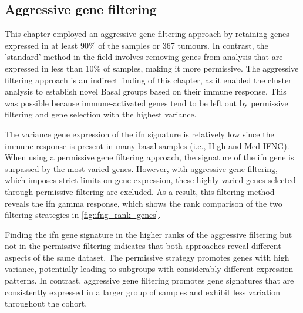 \subsection*{Aggressive gene filtering} \label{s:cs:agg_filt}


This chapter employed an aggressive gene filtering approach by retaining genes expressed in at least 90\% of the samples or 367 tumours. In contrast, the 'standard' method in the field involves removing genes from analysis that are expressed in less than 10\% of samples, making it more permissive. The aggressive filtering approach is an indirect finding of this chapter, as it enabled the cluster analysis to establish novel Basal groups based on their immune response. This was possible because immune-activated genes tend to be left out by permissive filtering and gene selection with the highest variance. 

The variance gene expression of the \acrshort{ifn} signature is relatively low since the immune response is present in many basal samples (i.e., High and Med IFNG). When using a permissive gene filtering approach, the signature of the \acrshort{ifn} gene is surpassed by the most varied genes. However, with aggressive gene filtering, which imposes strict limits on gene expression, these highly varied genes selected through permissive filtering are excluded. As a result, this filtering method reveals the \acrlong{ifn} gamma response, which shows the rank comparison of the two filtering strategies in \cref{fig:ifng_rank_genes}.

Finding the \acrlong{ifn} gene signature in the higher ranks of the aggressive filtering but not in the permissive filtering indicates that both approaches reveal different aspects of the same dataset. The permissive strategy promotes genes with high variance, potentially leading to subgroups with considerably different expression patterns. In contrast, aggressive gene filtering promotes gene signatures that are consistently expressed in a larger group of samples and exhibit less variation throughout the cohort.

